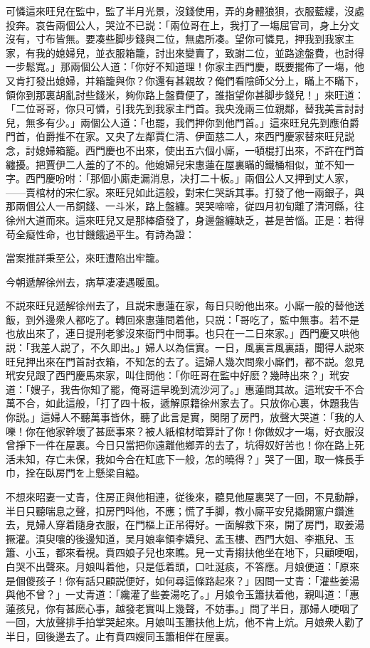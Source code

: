 可憐這來旺兒在監中，監了半月光景，沒錢使用，弄的身體狼狽，衣服藍縷，沒處投奔。哀告兩個公人，哭泣不已説：「兩位哥在上，我打了一塲屈官司，身上分文沒有，寸布皆無。要凑些脚步錢與二位，無處所凑。望你可憐見，押我到我家主家，有我的媳婦兒，並衣服箱籠，討出來變賣了，致謝二位，並路途盤費，也討得一步鬆寬。」那兩個公人道：「你好不知道理！你家主西門慶，既要擺佈了一塲，他又肯打發出媳婦，并箱籠與你？你還有甚親故？俺們看陰師父分上，瞞上不瞞下，領你到那裏胡亂討些錢米，夠你路上盤費便了，誰指望你甚脚步錢兒！」來旺道：「二位哥哥，你只可憐，引我先到我家主門首。我央浼兩三位親鄰，替我美言討討兒，無多有少。」兩個公人道：「也罷，我們押你到他門首。」這來旺兒先到應伯爵門首，伯爵推不在家。又央了左鄰賈仁清、伊面慈二人，來西門慶家替來旺兒説念，討媳婦箱籠。西門慶也不出來，使出五六個小廝，一頓棍打出來，不許在門首纏擾。把賈伊二人羞的了不的。他媳婦兒宋惠蓮在屋裏瞞的鐵桶相似，並不知一字。西門慶吩咐：「那個小廝走漏消息，决打二十板。」兩個公人又押到丈人家，——賣棺材的宋仁家。來旺兒如此這般，對宋仁哭訴其事。打發了他一兩銀子，與那兩個公人一吊銅錢、一斗米，路上盤纏。哭哭啼啼，従四月初旬離了清河縣，往徐州大道而來。這來旺兒又是那棒瘡發了，身邊盤纏缺乏，甚是苦惱。正是：若得苟全癡性命，也甘饑餓過平生。有詩為證：

\begin{myquote}
當案推詳秉至公，來旺遭陷出牢籠。

今朝遞解徐州去，病草凄凄遇暖風。
\end{myquote}

不説來旺兒遞解徐州去了，且説宋惠蓮在家，每日只盼他出來。小廝一般的替他送飯，到外邊衆人都吃了。轉回來惠蓮問着他，只説：「哥吃了，監中無事。若不是也放出來了，連日提刑老爹沒來衙門中問事。也只在一二日來家。」西門慶又哄他説：「我差人説了，不久即出。」婦人以為信實。一日，風裏言風裏語，聞得人説來旺兒押出來在門首討衣箱，不知怎的去了。這婦人幾次問衆小廝們，都不説。忽見玳安兒跟了西門慶馬來家，叫住問他：「你旺哥在監中好麽？幾時出來？」玳安道：「嫂子，我告你知了罷，俺哥這早晚到流沙河了。」惠蓮問其故。這玳安千不合萬不合，如此這般，「打了四十板，遞解原籍徐州家去了。只放你心裏，休題我告你説。」這婦人不聽萬事皆休，聽了此言是實，関閉了房門，放聲大哭道：「我的人嚛！你在他家幹壞了甚麽事來？被人紙棺材暗算計了你！你做奴才一塲，好衣服沒曾掙下一件在屋裏。今日只當把你遠離他鄉弄的去了，坑得奴好苦也！你在路上死活未知，存亡未保，我如今合在缸底下一般，怎的曉得？」哭了一囬，取一條長手巾，拴在臥房門を上懸梁自縊。

不想來昭妻一丈青，住房正與他相連，従後來，聽見他屋裏哭了一回，不見動靜，半日只聽喘息之聲，扣房門呌他，不應；慌了手脚，教小廝平安兒撬開窻户鑽進去，見婦人穿着隨身衣服，在門樞上正吊得好。一面解救下來，開了房門，取姜湯撅灌。湏臾嚷的後邊知道，吴月娘率領李嬌兒、孟玉樓、西門大姐、李瓶兒、玉簫、小玉，都來看視。賁四娘子兒也來瞧。見一丈青搊扶他坐在地下，只顧哽咽，白哭不出聲來。月娘叫着他，只是低着頭，口吐涎痰，不答應。月娘便道：「原來是個儍孩子！你有話只顧説便好，如何尋這條路起來？」因問一丈青：「灌些姜湯與他不曾？」一丈青道：「纔灌了些姜湯吃了。」月娘令玉簫扶着他，親叫道：「惠蓮孩兒，你有甚麽心事，越發老實叫上幾聲，不妨事。」問了半日，那婦人哽咽了一回，大放聲排手拍掌哭起來。月娘叫玉簫扶他上炕，他不肯上炕。月娘衆人勸了半日，回後邊去了。止有賁四嫂同玉簫相伴在屋裏。

